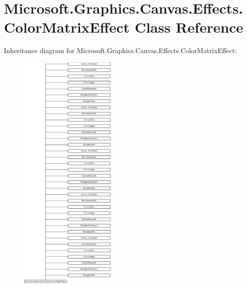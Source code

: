 \hypertarget{class_microsoft_1_1_graphics_1_1_canvas_1_1_effects_1_1_color_matrix_effect}{}\section{Microsoft.\+Graphics.\+Canvas.\+Effects.\+Color\+Matrix\+Effect Class Reference}
\label{class_microsoft_1_1_graphics_1_1_canvas_1_1_effects_1_1_color_matrix_effect}
Inheritance diagram for Microsoft.\+Graphics.\+Canvas.\+Effects.\+Color\+Matrix\+Effect\+:\begin{figure}[H]
\begin{center}
\leavevmode
\includegraphics[height=12.000000cm]{class_microsoft_1_1_graphics_1_1_canvas_1_1_effects_1_1_color_matrix_effect}
\end{center}
\end{figure}
